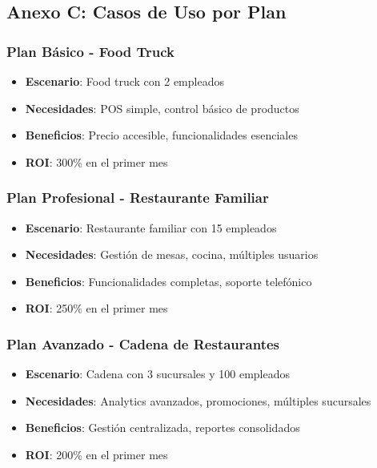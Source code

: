 \documentclass[12pt,a4paper]{article}
\begin{document}
\subsection{Anexo C: Casos de Uso por Plan}

\subsubsection{Plan Básico - Food Truck}

\begin{itemize}
    \item \textbf{Escenario}: Food truck con 2 empleados
    \item \textbf{Necesidades}: POS simple, control básico de productos
    \item \textbf{Beneficios}: Precio accesible, funcionalidades esenciales
    \item \textbf{ROI}: 300\% en el primer mes
\end{itemize}

\subsubsection{Plan Profesional - Restaurante Familiar}

\begin{itemize}
    \item \textbf{Escenario}: Restaurante familiar con 15 empleados
    \item \textbf{Necesidades}: Gestión de mesas, cocina, múltiples usuarios
    \item \textbf{Beneficios}: Funcionalidades completas, soporte telefónico
    \item \textbf{ROI}: 250\% en el primer mes
\end{itemize}

\subsubsection{Plan Avanzado - Cadena de Restaurantes}

\begin{itemize}
    \item \textbf{Escenario}: Cadena con 3 sucursales y 100 empleados
    \item \textbf{Necesidades}: Analytics avanzados, promociones, múltiples sucursales
    \item \textbf{Beneficios}: Gestión centralizada, reportes consolidados
    \item \textbf{ROI}: 200\% en el primer mes
\end{itemize}
\end{document}
